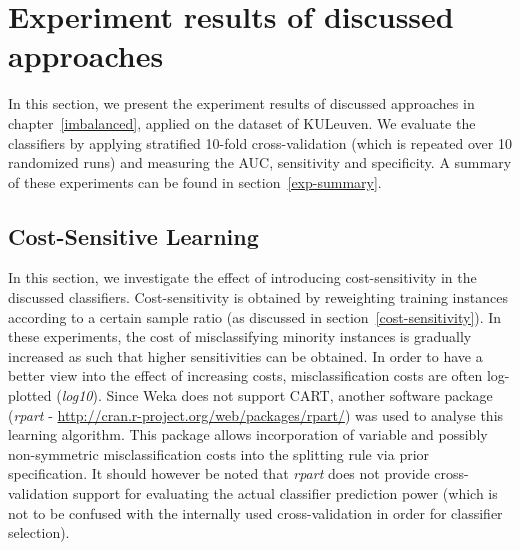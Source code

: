 \section{Experiment results of discussed approaches}\label{compex}
In this section, we present the experiment results of discussed approaches in chapter~\ref{imbalanced}, applied on the dataset of KULeuven. We evaluate the classifiers by applying stratified 10-fold cross-validation (which is repeated over 10 randomized runs) and measuring the AUC, sensitivity and specificity. A summary of these experiments can be found in section~\ref{exp-summary}.
\subsection{Cost-Sensitive Learning}\label{costsensitive}
In this section, we investigate the effect of introducing cost-sensitivity in the discussed classifiers. Cost-sensitivity is obtained by reweighting training instances according to a certain sample ratio (as discussed in section~\ref{cost-sensitivity}). In these experiments, the cost of misclassifying minority instances is gradually increased as such that higher sensitivities can be obtained. In order to have a better view into the effect of increasing costs, misclassification costs are often log-plotted (\textit{log10}). Since Weka does not support CART, another software package (\textit{rpart} - \url{http://cran.r-project.org/web/packages/rpart/}) was used to analyse this learning algorithm. This package allows incorporation of variable and possibly non-symmetric misclassification costs into the splitting rule via prior specification. It should however be noted that \textit{rpart} does not provide cross-validation support for evaluating the actual classifier prediction power (which is not to be confused with the internally used cross-validation in order for classifier selection).


